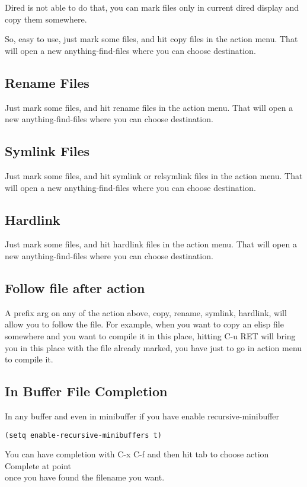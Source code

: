 \documentclass[a4paper,11pt]{article}
\begin{document}
Dired is not able to do that, you can mark files only in current dired display and copy them somewhere.

So, easy to use, just mark some files, and hit copy files in the action menu.
That will open a new anything-find-files where you can choose destination.
\subsection{Rename Files}
\label{sec:rename-files}
Just mark some files, and hit rename files in the action menu.
That will open a new anything-find-files where you can choose destination.
\subsection{Symlink Files}
\label{sec:symlink-files}
Just mark some files, and hit symlink or relsymlink files in the action menu.
That will open a new anything-find-files where you can choose destination.
\subsection{Hardlink}
\label{sec:hardlink}
Just mark some files, and hit hardlink files in the action menu.
That will open a new anything-find-files where you can choose destination.

\subsection{Follow file after action}
\label{sec:follow-file-after}
A prefix arg on any of the action above, copy, rename, symlink, hardlink, will
allow you to follow the file.
For example, when you want to copy an elisp file somewhere and you want to compile it in this place,
hitting C-u RET will bring you in this place with the file already marked, you have just to go in action menu to
compile it.  

\subsection{In Buffer File Completion}
\label{sec:buff-file-compl}
In any buffer and even in minibuffer if you have enable recursive-minibuffer
\begin{verbatim}
(setq enable-recursive-minibuffers t)
\end{verbatim}
You can have completion with C-x C-f and then hit tab to choose action Complete at point \\ 
once you have found the filename you want.
\end{document}
